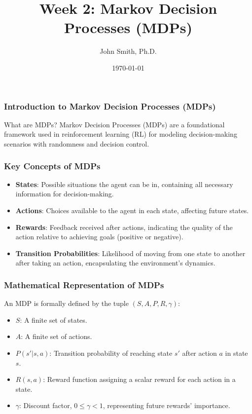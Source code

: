 \documentclass[aspectratio=169]{beamer}
\title[Week 2: MDPs]{Week 2: Markov Decision Processes (MDPs)}
\author[J. Smith]{John Smith, Ph.D.}
\institute[University Name]{
  Department of Computer Science\\
  University Name\\
  \vspace{0.3cm}
  Email: email@university.edu\\
  Website: www.university.edu
}
\date{\today}
\begin{document}
\frame{\titlepage}

\begin{frame}[fragile]
    \titlepage
\end{frame}

\begin{frame}[fragile]
    \frametitle{Introduction to Markov Decision Processes (MDPs)}
    \begin{block}{What are MDPs?}
        Markov Decision Processes (MDPs) are a foundational framework used in reinforcement learning (RL) for modeling decision-making scenarios with randomness and decision control.
    \end{block}
\end{frame}

\begin{frame}[fragile]
    \frametitle{Key Concepts of MDPs}
    \begin{itemize}
        \item \textbf{States}: Possible situations the agent can be in, containing all necessary information for decision-making.
        \item \textbf{Actions}: Choices available to the agent in each state, affecting future states.
        \item \textbf{Rewards}: Feedback received after actions, indicating the quality of the action relative to achieving goals (positive or negative).
        \item \textbf{Transition Probabilities}: Likelihood of moving from one state to another after taking an action, encapsulating the environment's dynamics.
    \end{itemize}
\end{frame}

\begin{frame}[fragile]
    \frametitle{Mathematical Representation of MDPs}
    An MDP is formally defined by the tuple \( (S, A, P, R, \gamma) \):
    \begin{itemize}
        \item \( S \): A finite set of states.
        \item \( A \): A finite set of actions.
        \item \( P(s'|s, a) \): Transition probability of reaching state \( s' \) after action \( a \) in state \( s \).
        \item \( R(s, a) \): Reward function assigning a scalar reward for each action in a state.
        \item \( \gamma \): Discount factor, \( 0 \leq \gamma < 1 \), representing future rewards' importance.
    \end{itemize}
\end{frame}
\end{document}
